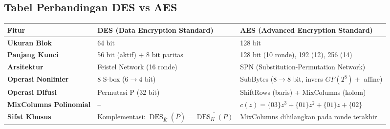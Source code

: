 \documentclass[11pt,a4paper]{article}
\begin{document}
\subsection{Tabel Perbandingan DES vs AES}
\begin{table}[H]
\centering
\small
\begin{tabular}{p{3.8cm} p{5.8cm} p{5.8cm}}
\toprule
\textbf{Fitur} & \textbf{DES (Data Encryption Standard)} & \textbf{AES (Advanced Encryption Standard)} \\
\midrule
\textbf{Ukuran Blok} & 64 bit & 128 bit \\
\textbf{Panjang Kunci} & 56 bit (aktif) + 8 bit paritas & 128 bit (10 ronde), 192 (12), 256 (14) \\
\textbf{Arsitektur} & Feistel Network (16 ronde) & SPN (Substitution-Permutation Network) \\
\textbf{Operasi Nonlinier} & 8 S-box ($6 \to 4$ bit) & SubBytes ($8 \to 8$ bit, invers $GF(2^8) +$ affine) \\
\textbf{Operasi Difusi} & Permutasi P (32 bit) & ShiftRows (baris) + MixColumns (kolom) \\
\textbf{MixColumns Polinomial} & -- & $c(z) = \{03\}z^3 + \{01\}z^2 + \{01\}z + \{02\}$ \\
\textbf{Sifat Khusus} & Komplementasi: $\operatorname{DES}_{\bar{K}}(\bar{P}) = \overline{\operatorname{DES}_K(P)}$ & MixColumns dihilangkan pada ronde terakhir \\
\bottomrule
\end{tabular}
\end{table}
\end{document}
